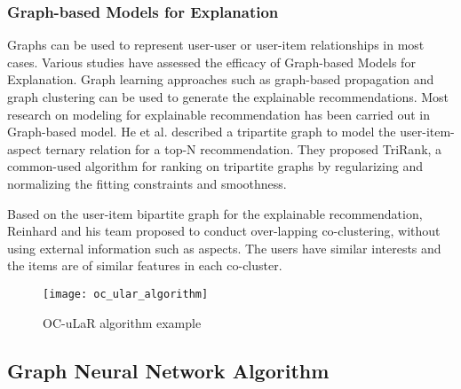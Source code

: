 \subsubsection{Graph-based Models for Explanation}
Graphs can be used to represent user-user or user-item relationships in most cases. Various studies have assessed the efficacy of Graph-based Models for Explanation. Graph learning approaches such as graph-based propagation and graph clustering can be used to generate the explainable recommendations. Most research on modeling for explainable recommendation has been carried out in Graph-based model. He et al.\cite{he2015trirank} described a tripartite graph to model the user-item-aspect ternary relation for a top-N recommendation. They proposed TriRank, a common-used algorithm for ranking on tripartite graphs by regularizing and normalizing the fitting constraints and smoothness.
\par Based on the user-item bipartite graph for the explainable recommendation, Reinhard and his team \cite{heckel2017scalable} proposed to conduct over-lapping co-clustering, without using external information such as aspects. The users have similar interests and the items are of similar features in each co-cluster. 

\begin{figure}[h]
\caption{OC-uLaR algorithm example\cite{heckel2017scalable}}
\label{figure:2-1}
\centering
\texttt{[image: oc\_ular\_algorithm]}
\end{figure}

\subsection{Graph Neural Network Algorithm}
